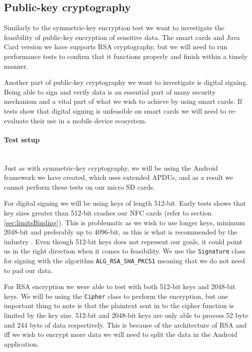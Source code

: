 \subsection{Public-key cryptography}
\label{sec:AsymmetricTest}
Similarly to the symmetric-key encryption test we want to investigate the feasibility of public-key encryption of sensitive data. The smart cards and Java Card version we have supports RSA cryptography, but we will need to run performance tests to confirm that it functions properly and finish within a timely manner.

Another part of public-key cryptography we want to investigate is digital signing. Being able to sign and verify data is an essential part of many security mechanism and a vital part of what we wish to achieve by using smart cards. If tests show that digital signing is unfeasible on smart cards we will need to re-evaluate their use in a mobile device ecosystem.

\paragraph{Test setup}\mbox{}\\
Just as with symmetric-key cryptography, we will be using the Android framework we have created, which uses extended APDUs, and as a result we cannot perform these tests on our micro SD cards.

For digital signing we will be using keys of length 512-bit. Early tests shows that key sizes greater than 512-bit crashes our NFC cards (refer to section \ref{sec:limitsBinding}). This is problematic as we wish to use longer keys, minimum 2048-bit and preferably up to 4096-bit, as this is what is recommended by the industry \cite{rsaRec}. Even though 512-bit keys does not represent our goals, it could point us in the right direction when it comes to feasibility. We use the \texttt{Signature} class for signing with the algorithm \texttt{ALG\_RSA\_SHA\_PKCS1} meaning that we do not need to pad our data.

For RSA encryption we were able to test with both 512-bit keys and 2048-bit keys. We will be using the \texttt{Cipher} class to perform the encryption, but one important thing to note is that the plaintext sent in to the cipher function is limited by the key size. 512-bit and 2048-bit keys are only able to process 52 byte and 244 byte of data respectively. This is because of the architecture of RSA and iff we wish to encrypt more data we will need to split the data in the Android application.

